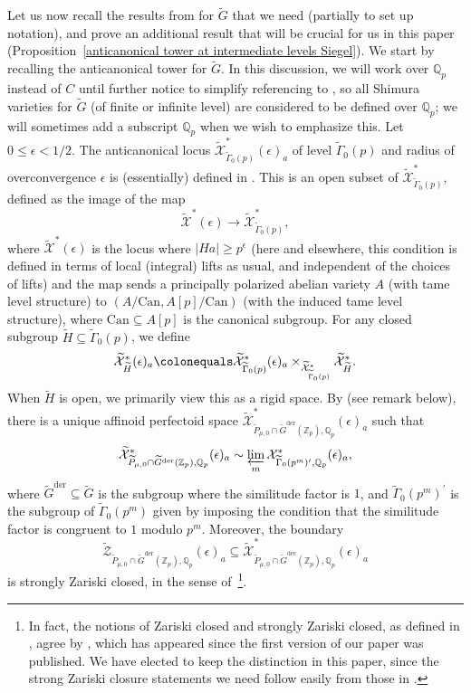 \documentclass{amsart}
\theoremstyle{remark}
\numberwithin{equation}{subsection}
\newcommand{\Q}{\QQ}
\newcommand{\Z}{\ZZ}
\newcommand{\QQ}{{\mathbb Q}}
\newcommand{\ZZ}{{\mathbb Z}}
\newcommand{\cX}{{\mathcal X}}
\newcommand{\cZ}{{\mathcal Z}}
\newcommand{\Zp}{\Z_p}
\newcommand{\Qp}{\Q_p}
\newcommand{\Can}{\mathrm{Can}}
\newcommand{\tGam}{\widetilde{\Gamma}}
\newcommand{\tG}{\widetilde{G}}
\newcommand{\tH}{\widetilde{H}}
\newcommand{\tP}{\widetilde{P}}
\newcommand{\wt}{\widetilde}
\newcommand{\sub}{\subseteq}
\newcommand{\defeq}{\colonequals}
\renewcommand{\(}{\left(}
\renewcommand{\)}{\right)}
\begin{document}
Let us now recall the results from \cite[\S 3]{scholze-galois} for $\tG$ that we need (partially to set up notation), and prove an additional result that will be crucial for us in this paper (Proposition~\ref{anticanonical tower at intermediate levels Siegel}). 
We start by recalling the anticanonical tower for $\tG$. In this discussion, we will work over $\Qp$ instead of $C$ until further notice to simplify referencing to \cite{scholze-galois}, so all Shimura varieties for $\tG$ (of finite or infinite level) are considered to be defined over $\Qp$; we will sometimes add a subscript $\Qp$ when we wish to emphasize this. Let $0\leq \epsilon <1/2$. The anticanonical locus $\wt{\cX}^{\ast}_{\tGam_{0}(p)}(\epsilon)_{a}$ of level $\tGam_{0}(p)$ and radius of overconvergence $\epsilon$ is (essentially) defined in \cite[Theorem 3.2.15(iii)]{scholze-galois}. This is an open subset of $\wt{\cX}^{\ast}_{\tGam_{0}(p)}$, defined as the image of the map
\[
 \wt{\cX}^{\ast}(\epsilon) \to \wt{\cX}^{\ast}_{\tGam_{0}(p)},
\]
where $\wt{\cX}^{\ast}(\epsilon)$ is the locus where $|Ha|\geq p^{\epsilon}$ (here and elsewhere, this condition is defined in terms of local (integral) lifts as usual, and independent of the choices of lifts) and the map sends a principally polarized abelian variety $A$ (with tame level structure) to $(A/\Can,A[p]/\Can)$ (with the induced tame level structure), where $\Can \sub A[p]$ is the canonical subgroup. For any closed subgroup $\tH \sub \tGam_{0}(p)$, we define
\[
  \wt{\cX}^{\ast}_{\tH}(\epsilon)_{a} \defeq \wt{\cX}^{\ast}_{\tGam_{0}(p)}(\epsilon)_{a} \times_{\wt{\cX}^{\ast}_{\tGam_{0}(p)}} \wt{\cX}^{\ast}_{\tH}.
\]
When $\tH$ is open, we primarily view this as a rigid space.
By \cite[Corollary 3.2.19]{scholze-galois} (see remark below), there is a unique affinoid perfectoid space $\wt{\cX}_{\tP_{\mu,0}\cap \tG^{\mathrm{der}}(\Zp), \Qp}^\ast(\epsilon)_a$ such that
\[
\wt{\cX}^{\ast}_{\tP_{\mu,0} \cap \tG^\mathrm{der}(\Zp), \Qp}(\epsilon)_a\sim \varprojlim_m \mathcal{X}^\ast_{\tGam_{0}(p^m)^{\prime}, \Qp}(\epsilon)_{a},
\]
where $\tG^\mathrm{der}\sub \tG$ is the subgroup where the similitude factor is $1$, and $\tGam_{0}(p^{m})^{\prime}$ is the subgroup of $\tGam_{0}(p^{m})$ given by imposing the condition that the similitude factor is congruent to $1$ modulo $p^m$. Moreover, the boundary 
\[
\wt{\cZ}_{\tP_{\mu,0}\cap \tG^\mathrm{der}(\Zp), \Qp}(\epsilon)_{a} \sub \wt{\cX}^{\ast}_{\tP_{\mu,0}\cap \tG^\mathrm{der}(\Zp),\Qp}(\epsilon)_{a}
\]
is strongly Zariski closed, in the sense of~\cite[Definition 2.2.6]{scholze-galois}\footnote{In fact, the notions of Zariski closed and strongly Zariski closed, as defined in \cite[\S 2]{scholze-galois}, agree by \cite[Remark 7.5]{prismatic}, which has appeared since the first version of our paper was published. We have elected to keep the distinction in this paper, since the strong Zariski closure statements we need follow easily from those in \cite{scholze-galois}.}. 
\end{document}
